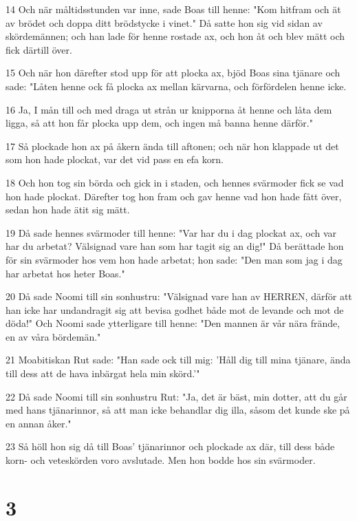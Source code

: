 \par 14 Och när måltidsstunden var inne, sade Boas till henne: "Kom hitfram och ät av brödet och doppa ditt brödstycke i vinet." Då satte hon sig vid sidan av skördemännen; och han lade för henne rostade ax, och hon åt och blev mätt och fick därtill över.
\par 15 Och när hon därefter stod upp för att plocka ax, bjöd Boas sina tjänare och sade: "Låten henne ock få plocka ax mellan kärvarna, och förfördelen henne icke.
\par 16 Ja, I mån till och med draga ut strån ur knipporna åt henne och låta dem ligga, så att hon får plocka upp dem, och ingen må banna henne därför."
\par 17 Så plockade hon ax på åkern ända till aftonen; och när hon klappade ut det som hon hade plockat, var det vid pass en efa korn.
\par 18 Och hon tog sin börda och gick in i staden, och hennes svärmoder fick se vad hon hade plockat. Därefter tog hon fram och gav henne vad hon hade fått över, sedan hon hade ätit sig mätt.
\par 19 Då sade hennes svärmoder till henne: "Var har du i dag plockat ax, och var har du arbetat? Välsignad vare han som har tagit sig an dig!" Då berättade hon för sin svärmoder hos vem hon hade arbetat; hon sade: "Den man som jag i dag har arbetat hos heter Boas."
\par 20 Då sade Noomi till sin sonhustru: "Välsignad vare han av HERREN, därför att han icke har undandragit sig att bevisa godhet både mot de levande och mot de döda!" Och Noomi sade ytterligare till henne: "Den mannen är vår nära frände, en av våra bördemän."
\par 21 Moabitiskan Rut sade: "Han sade ock till mig: 'Håll dig till mina tjänare, ända till dess att de hava inbärgat hela min skörd.'"
\par 22 Då sade Noomi till sin sonhustru Rut: "Ja, det är bäst, min dotter, att du går med hans tjänarinnor, så att man icke behandlar dig illa, såsom det kunde ske på en annan åker."
\par 23 Så höll hon sig då till Boas' tjänarinnor och plockade ax där, till dess både korn- och veteskörden voro avslutade. Men hon bodde hos sin svärmoder.

\chapter{3}

